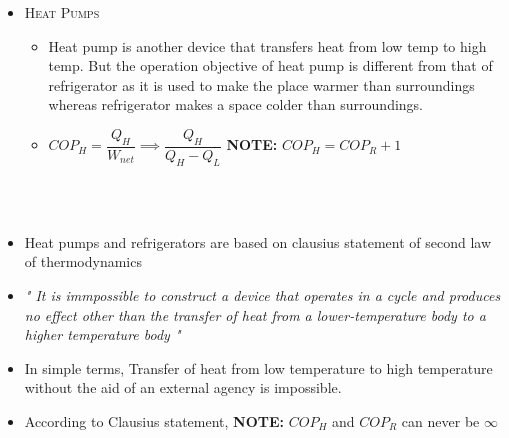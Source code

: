 \documentclass[8pt]{article}
\begin{document}
\begin{itemize}[wide]
\begin{itemize}
					\item \textsc{Heat Pumps}
						\begin{itemize}[wide]
							\item Heat pump is another device that transfers heat from low temp to high temp. But the operation objective of heat pump is different from that of refrigerator as it is used to make the place warmer than surroundings whereas refrigerator makes a space colder than surroundings. 
							\item $\boxed{COP_H = \dfrac{Q_H}{W_{net}} \implies \dfrac{Q_H}{Q_H-Q_L}}$ \textbf{NOTE:} $\boxed{COP_H=COP_R+1}$
						\end{itemize}
					\end{itemize}
				\end{itemize}		 
			\hrulefill\\\pagebreak
\\
			\begin{itemize}
				\item Heat pumps and refrigerators are based on clausius statement of second law of thermodynamics
				\item \textit{" It is immpossible to construct a device that operates in a cycle and produces no effect other than the transfer of heat from a lower-temperature body to a higher temperature body "}
				\item In simple terms, Transfer of heat from low temperature to high temperature without the aid of an external agency is impossible. 
				\item According to Clausius statement, \textbf{NOTE:} $COP_H$ and $COP_R$ can never be $\infty$	
			\end{itemize}				
	\hrulefill\\
\\
\end{document}
